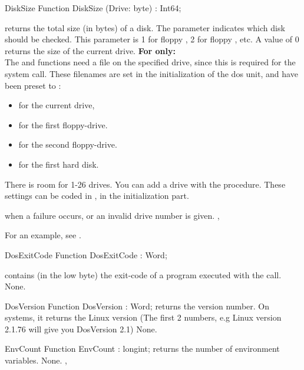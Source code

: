 \begin{function}{DiskSize}
\Declaration
Function DiskSize (Drive: byte) : Int64;
\Description

 returns the total size (in bytes) of a disk. The parameter
 indicates which disk should be checked. This parameter is 1 for
floppy , 2 for floppy , etc. A value of 0 returns the size
of the current drive. 
\textbf{For \linux only:}\\
The  and  functions need a file on the specified drive, since this
is required for the  system call.
  These filenames are set in the initialization of the dos unit, and have 
been preset to :
\begin{itemize}
\item {} for the current drive, 
\item {} for the first floppy-drive.
\item {} for the second floppy-drive.
\item {} for the first hard disk.
\end{itemize}
There is room for 1-26 drives. You can add a drive with the
 procedure.
These settings can be coded in , in the initialization part.

 when a failure occurs, or an invalid drive number is given.
\SeeAlso
{}, 
\end{function}
For an example, see .
\begin{function}{DosExitCode}
\Declaration
Function DosExitCode  : Word;
\Description

 contains (in the low byte) the exit-code of a program 
executed with the  call.
\Errors
None.
\SeeAlso
{}
\end{function}


\begin{function}{DosVersion}
\Declaration
Function DosVersion  : Word;
\Description
{} returns the \dos version number. On \linux systems, it
returns the Linux version (The first 2 numbers, e.g Linux version 2.1.76 will
give you DosVersion 2.1)
\Errors
None.
\SeeAlso

\end{function}




\begin{function}{EnvCount}
\Declaration
Function EnvCount  : longint;\Description
{} returns the number of environment variables.
\Errors
None.
\SeeAlso
{}, 
\end{function}

